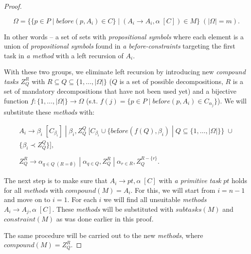 \begin{proof}
\begin{enumerate}
        \[
            \Omega = \{\{ p \in P \; | \; be\text{f}ore(p, A_i) \in C\} \; | \; (A_i \rightarrow A_i, \alpha \; [C]) \in M \} \; (|\Omega| = m).
        \]
        
        In other words – a set of sets with \emph{propositional symbols} where each element is a union of \emph{propositional symbols} found in \emph{a before-constraints} targeting the first task in \emph{a method} with a left recursion of $A_i$.

        With these two groups, we eliminate left recursion by introducing new \emph{compound tasks} $Z_Q^R$ with $R \subseteq Q \subseteq \{1, \dots, |\Omega|\}$ ($Q$ is a set of possible decompositions, $R$ is a set of mandatory decompositions that have not been used yet) and a bijective function $f: \{1, \dots, |\Omega|\} \rightarrow \Omega$ (s.t. $f(j) = \{p \in P \; | \; be\text{f}ore(p, A_i) \in C_{\alpha_j}\}$). We will substitute these \emph{methods} with:

        \begin{gather*}
            A_i \rightarrow \beta_i \; [C_{\beta_i}] \; | \; \beta_i, Z_Q^Q \; [C_{\beta_i} \cup \{be\text{f}ore(f(Q), \beta_i) \; | \; Q \subseteq \{1, \dots, |\Omega|\}\} \; \cup \\ \{\beta_i \prec Z_Q^Q\}], \\ \\
            Z_Q^R \rightarrow \alpha_{q \in Q \; (R = \emptyset)} \; | \; \alpha_{q \in Q}, Z_Q^R \; | \; \alpha_{r \in R}, Z_Q^{R - \{r\}}.
        \end{gather*}
    \end{enumerate}
    
    The next step is to make sure that $A_i \rightarrow pt, \alpha \; [C]$ with \emph{a primitive task} $pt$ holds for all \emph{methods} with $compound(M) = A_i$. For this, we will start from $i = n - 1$ and move on to $i = 1$. For each $i$ we will find all unsuitable \emph{methods} $A_i \rightarrow A_j, \alpha \; [C]$. These \emph{methods} will be substituted with $subtasks(M)$ and $constraint(M)$ as was done earlier in this proof.

    The same procedure will be carried out to the new \emph{methods}, where \\ $compound(M) = Z_Q^{R}$.
\end{proof}




